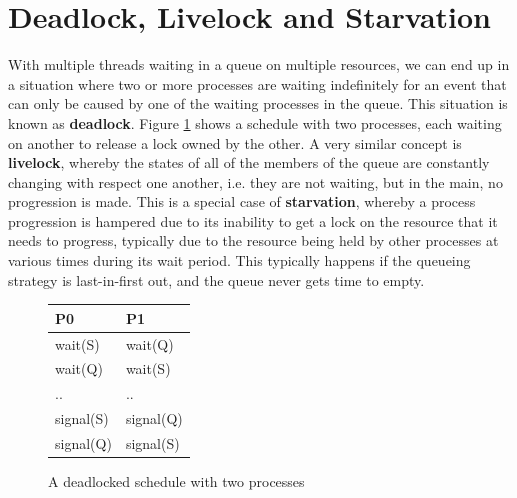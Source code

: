 \documentclass[10pt,a4paper]{article}
\begin{document}
\section{Deadlock, Livelock and Starvation}
With multiple threads waiting in a queue on multiple resources, we can end up in a situation where two or more processes are waiting indefinitely for an event that can only be caused by one of the waiting processes in the queue. This situation is known as {\bf deadlock}. Figure \ref{deadlock} shows a schedule with two processes, each waiting on another to release a lock owned by the other. A very similar concept is {\bf livelock}, whereby the states of all of the members of the queue are constantly changing with respect one another, i.e. they are not waiting, but in the main, no progression is made. This is a special case of {\bf starvation}, whereby a process progression is hampered due to its inability to get a lock on the resource that it needs to progress, typically due to the resource being held by other processes at various times during its wait period. This typically happens if the queueing strategy is last-in-first out, and the queue never gets time to empty. 
\begin{figure}
\caption{A deadlocked schedule with two processes}
\begin{center}
\begin{tabular}{| l | l | }
  \hline
  P0 & P1 \\ \hline
  wait(S) & wait(Q) \\
  wait(Q) & wait(S) \\
  .. & .. \\
  signal(S) & signal(Q) \\
  signal(Q)	& signal(S) \\
  \hline
\end{tabular}
\label{deadlock}
\end{center}
\end{figure}
\end{document}
